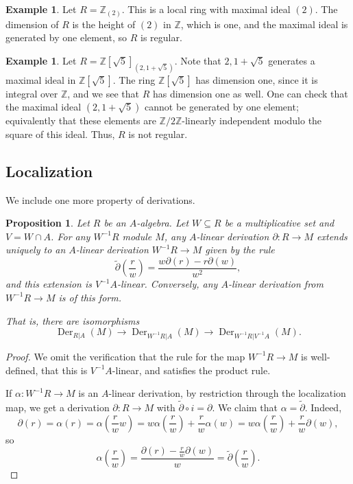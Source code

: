 \documentclass{amsart}[12pt]
\def\Der{\operatorname{Der}}
\newcommand{\Z}{\mathbb{Z}}
\numberwithin{equation}{section}
\theoremstyle{plain} %
\newtheorem{prop}[equation]{Proposition}
\theoremstyle{definition}
\newtheorem{ex}[equation]{Example}
\theoremstyle{remark}
\newcommand{\ssec}[1]{\subsection{#1}}
\begin{document}
\begin{ex}
Let $R=\Z_{(2)}$. This is a local ring with maximal ideal $(2)$. The dimension of $R$ is the height of $(2)$ in $\Z$, which is one, and the maximal ideal is generated by one element, so $R$ is regular.
\end{ex}

\begin{ex}
Let $R=\Z[\sqrt{5}]_{(2,1+\sqrt{5})}$. Note that $2,1+\sqrt{5}$ generates a maximal ideal in $\Z[\sqrt{5}]$. The ring $\Z[\sqrt{5}]$ has dimension one, since it is integral over $\Z$, and we see that $R$ has dimension one as well. One can check that the maximal ideal $(2,1+\sqrt{5})$ cannot be generated by one element; equivalently that these elements are $\Z/2\Z$-linearly independent modulo the square of this ideal. Thus, $R$ is not regular.
\end{ex}




\ssec{Localization}
 We include one more property of derivations.
 
 \begin{prop} Let $R$ be an $A$-algebra. Let $W \subseteq R$ be a multiplicative set and $V=W\cap A$. For any $W^{-1}R$ module $M$, any $A$-linear derivation $\partial:R\to M$ extends uniquely to an $A$-linear derivation $W^{-1}R \to M$ given by the rule
 \[\widetilde{\partial}\left(\frac{r}{w}\right) = \frac{w \partial(r) - r\partial(w)}{w^2},\]
 and this extension is $V^{-1}A$-linear. Conversely, any $A$-linear derivation from $W^{-1}R \to M$ is of this form.
 
 That is, there are isomorphisms
 \[ \Der_{R|A}(M) \to  \Der_{W^{-1}R|A}(M) \to  \Der_{W^{-1}R|V^{-1}A}(M).\]
 \end{prop}
 \begin{proof}
 We omit the verification that the rule for the map $W^{-1}R \to M$ is well-defined, that this is $V^{-1}A$-linear, and satisfies the product rule. 
 
 If $\alpha:W^{-1}R \to M$ is an $A$-linear derivation, by restriction through the localization map, we get a derivation $\partial:R\to M$ with $\widetilde{\partial} \circ i = \partial$. We claim that $\alpha=\widetilde{\partial}$. Indeed, \[ \partial(r) = \alpha(r) = \alpha(\frac{r}{w} w) = w \alpha(\frac{r}{w}) + \frac{r}{w} \alpha(w) =  w \alpha(\frac{r}{w}) + \frac{r}{w} \partial(w), \]
 so \[\alpha (\frac{r}{w}) = \frac{ \partial(r)-\frac{r}{w} \partial(w) }{w} = \widetilde{\partial}(\frac{r}{w}).\]
 \end{proof}
\end{document}

